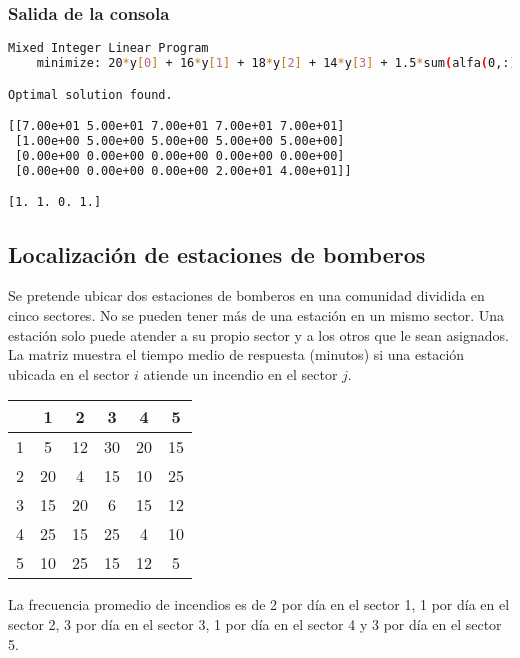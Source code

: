 \documentclass[12pt]{article}
\begin{document}
\subsubsection{Salida de la consola}

\begin{lstlisting}[language=bash,backgroundcolor=\color{black},basicstyle=\color{white}\ttfamily,numbers=none]
Mixed Integer Linear Program
    minimize: 20*y[0] + 16*y[1] + 18*y[2] + 14*y[3] + 1.5*sum(alfa(0,:)) + 0.8*sum(alfa(1,:)) + 1.3*sum(alfa(2,:)) + 0.6*sum(alfa(3,:))...

Optimal solution found.

[[7.00e+01 5.00e+01 7.00e+01 7.00e+01 7.00e+01]
 [1.00e+00 5.00e+00 5.00e+00 5.00e+00 5.00e+00]
 [0.00e+00 0.00e+00 0.00e+00 0.00e+00 0.00e+00]
 [0.00e+00 0.00e+00 0.00e+00 2.00e+01 4.00e+01]]

[1. 1. 0. 1.]
\end{lstlisting}

\subsection{Localización de estaciones de bomberos}
Se pretende ubicar dos estaciones de bomberos en una comunidad dividida en cinco sectores. No se pueden tener más de una estación en un mismo sector. Una estación solo puede atender a su propio sector y a los otros que le sean asignados. La matriz muestra el tiempo medio de respuesta (minutos) si una estación ubicada en el sector $i$ atiende un incendio en el sector $j$.

\begin{table}[H]
    \centering
    \begin{tabular}{c|ccccc}
        \toprule
        & 1 & 2 & 3 & 4 & 5 \\
        \midrule
        1 & 5 & 12 & 30 & 20 & 15 \\
        2 & 20 & 4 & 15 & 10 & 25 \\
        3 & 15 & 20 & 6 & 15 & 12 \\
        4 & 25 & 15 & 25 & 4 & 10 \\
        5 & 10 & 25 & 15 & 12 & 5 \\
        \bottomrule
    \end{tabular}
\end{table}

La frecuencia promedio de incendios es de 2 por día en el sector 1, 1 por día en el sector 2, 3 por día en el sector 3, 1 por día en el sector 4 y 3 por día en el sector 5.
\end{document}
